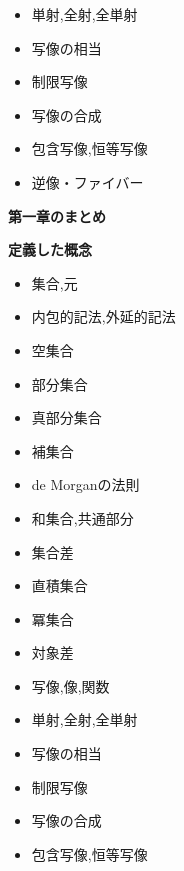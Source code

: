 \documentclass[dvipdfmx,b4j]{jsarticle}
\begin{document}
\begin{itemize}
  \item 単射,全射,全単射
  \item 写像の相当
  \item 制限写像
  \item 写像の合成
  \item 包含写像,恒等写像
  \item 逆像・ファイバー
\end{itemize}
\clearpage
\centerline{\huge{\textbf{第一章のまとめ}}}
\begin{shaded}
\noindent\textbf{定義した概念}
\begin{multicols}{2}
\begin{itemize}
  \item 集合,元
  \item 内包的記法,外延的記法
  \item 空集合 
  \item 部分集合
  \item 真部分集合
  \item 補集合
  \item de Morganの法則
  \item 和集合,共通部分
  \item 集合差
  \item 直積集合
  \item 冪集合
  \item 対象差
  \item 写像,像,関数
  \item 単射,全射,全単射
  \item 写像の相当
  \item 制限写像
  \item 写像の合成
  \item 包含写像,恒等写像
\end{itemize}
\end{multicols}
\end{shaded}
\clearpage

\
\clearpage
\section{}
\clearpage
\end{document}
